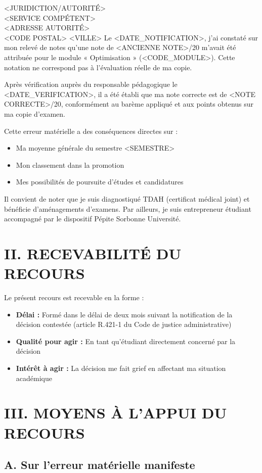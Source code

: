 \documentclass[12pt,french]{scrlttr2}
\begin{document}
\begin{letter}{
<JURIDICTION/AUTORITÉ>\\
<SERVICE COMPÉTENT>\\
<ADRESSE AUTORITÉ>\\
<CODE POSTAL> <VILLE>
}
Le <DATE_NOTIFICATION>, j'ai constaté sur mon relevé de notes qu'une note de <ANCIENNE NOTE>/20 m'avait été attribuée pour le module « Optimisation » (<CODE_MODULE>). Cette notation ne correspond pas à l'évaluation réelle de ma copie.

Après vérification auprès du responsable pédagogique le <DATE_VERIFICATION>, il a été établi que ma note correcte est de <NOTE CORRECTE>/20, conformément au barème appliqué et aux points obtenus sur ma copie d'examen.

Cette erreur matérielle a des conséquences directes sur :
\begin{itemize}
\item Ma moyenne générale du semestre <SEMESTRE>
\item Mon classement dans la promotion
\item Mes possibilités de poursuite d'études et candidatures
\end{itemize}

Il convient de noter que je suis diagnostiqué TDAH (certificat médical joint) et bénéficie d'aménagements d'examens. Par ailleurs, je suis entrepreneur étudiant accompagné par le dispositif Pépite Sorbonne Université.

\section*{II. RECEVABILITÉ DU RECOURS}

Le présent recours est recevable en la forme :
\begin{itemize}
\item \textbf{Délai :} Formé dans le délai de deux mois suivant la notification de la décision contestée (article R.421-1 du Code de justice administrative)
\item \textbf{Qualité pour agir :} En tant qu'étudiant directement concerné par la décision
\item \textbf{Intérêt à agir :} La décision me fait grief en affectant ma situation académique
\end{itemize}

\section*{III. MOYENS À L'APPUI DU RECOURS}

\subsection*{A. Sur l'erreur matérielle manifeste}


\end{letter}
\end{document}
